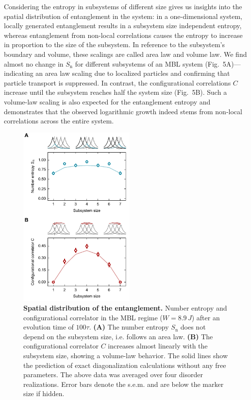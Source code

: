 Considering the entropy in subsystems of different size gives us insights into the spatial distribution of entanglement in the system: in a one-dimensional system, locally generated entanglement results in a subsystem size independent entropy, whereas entanglement from non-local correlations causes the entropy to increase in proportion to the size of the subsystem. In reference to the subsystem's boundary and volume, these scalings are called area law and volume law. We find almost no change in $S_\text{n}$ for different subsystems of an MBL system (Fig.~5A)---indicating an area law scaling due to localized particles and confirming that particle transport is suppressed. In contrast, the configurational correlations $C$ increase until the subsystem reaches half the system size (Fig.~5B). Such a volume-law scaling is also expected for the entanglement entropy and demonstrates that the observed logarithmic growth indeed stems from non-local correlations across the entire system.

\begin{figure}[h!]
	\centering
	\includegraphics[width=58mm]{figures/MBL_scaling.pdf}
	\caption{{\bf Spatial distribution of the entanglement.} Number entropy and configurational correlator in the MBL regime ($W=8.9\,J$) after an evolution time of $100\tau$. {\bf (A)} The number entropy $S_\text{n}$ does not depend on the subsystem size, i.e. follows an area law. {\bf (B)} The configurational correlator $C$ increases almost linearly with the subsystem size, showing a volume-law behavior. The solid lines show the prediction of exact diagonalization calculations without any free parameters. The above data was averaged over four disorder realizations. Error bars denote the s.e.m. and are below the marker size if hidden.}
	\label{fig:scalings}
\end{figure}

